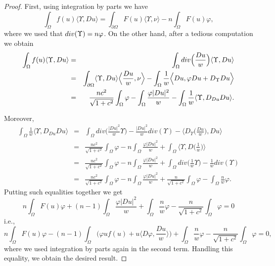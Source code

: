 \documentclass[10pt,a4paper]{amsart}
\begin{document}
\begin{proof}
First, using integration by parts we have
\[
\int_\Omega f(u)\langle \Upsilon, Du\rangle = \int_{\partial\Omega}F(u)\langle\Upsilon, \nu\rangle - n\int_\Omega F(u)\varphi,
\]
where we used that ${\rm div}(\Upsilon)=n\varphi$.
On the other hand, after a tedious computation we obtain
\begin{eqnarray*}
\int_\Omega f(u)\langle \Upsilon, Du\rangle &=&\int_\Omega {\rm div}\Big(\frac{Du}{w}\Big)\langle\Upsilon, Du\rangle\\
&=& \int_{\partial\Omega}\langle\Upsilon, Du\rangle\Big\langle \frac{Du}{w}, \nu\Big\rangle - \int_\Omega\frac{1}{w}\Big\langle Du, \varphi Du + D_\Upsilon Du\Big\rangle \\
&=& \frac{nc^2}{\sqrt{1+c^2}}\int_\Omega \varphi - \int_\Omega\frac{\varphi |Du|^2}{w} - \int_\Omega\frac{1}{w}\langle \Upsilon, D_{Du}Du\rangle.
\end{eqnarray*}

Moreover,
\begin{eqnarray*}
\int_\Omega\frac{1}{w}\langle \Upsilon, D_{Du}Du\rangle &=&\int_\Omega div\Big(\frac{|Du|^2}{w}\Upsilon\Big) - \frac{|Du|^2}{w}div(\Upsilon) - \Big\langle D_\Upsilon\Big(\frac{Du}{w}\Big), Du\Big\rangle\\
&=&\frac{nc^2}{\sqrt{1+c^2}}\int_\Omega\varphi - n\int_\Omega\frac{\varphi |Du|^2}{w} + \int_\Omega\Big\langle \Upsilon, D\Big(\frac{1}{w}\Big)\Big\rangle\\
&=& \frac{nc^2}{\sqrt{1+c^2}}\int_\Omega\varphi - n\int_\Omega\frac{\varphi |Du|^2}{w} + \int_\Omega div\Big(\frac{1}{w}\Upsilon\Big) - \frac{1}{w}div(\Upsilon) \\
&=& \frac{nc^2}{\sqrt{1+c^2}}\int_\Omega\varphi - n\int_\Omega\frac{\varphi |Du|^2}{w} + \frac{n}{\sqrt{1+c^2}}\int_\Omega\varphi - \int_\Omega\frac{n}{w}\varphi.
\end{eqnarray*}
Putting such equalities together we get
\[
n\int_\Omega F(u)\varphi + (n-1)\int_\Omega \frac{\varphi |Du|^2}{w} +\int_\Omega \frac{n}{w}\varphi - \frac{n}{\sqrt{1+c^2}}\int_\Omega\varphi=0
\]
i.e.,
\[
n\int_\Omega F(u)\varphi - (n-1)\int_\Omega \Big(\varphi uf(u) + u\Big\langle D\varphi, \frac{Du}{w}\Big\rangle\Big) +\int_\Omega \frac{n}{w}\varphi - \frac{n}{\sqrt{1+c^2}}\int_\Omega\varphi=0,
\]
where we used integration by parts again in the second term. Handling this equality, we obtain the desired result.

\end{proof}
\end{document}
